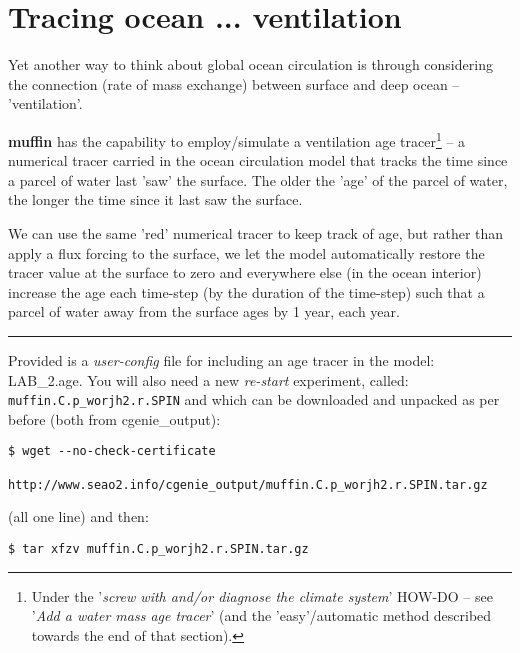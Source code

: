 \newpage

\section{Tracing ocean ... ventilation}

Yet another way to think about global ocean circulation is through considering the connection (rate of mass exchange) between surface and deep ocean -- 'ventilation'.

\textbf{muffin} has the capability to employ/simulate a ventilation age tracer\footnote{Under the '\textit{screw with and/or diagnose the climate system}' HOW-DO -- see '\textit{Add a water mass age tracer}' (and the 'easy'/automatic method described towards the end of that section).} -- a numerical tracer carried in the ocean circulation model that tracks the time since a parcel of water last 'saw' the surface. The older the 'age' of the parcel of water, the longer the time since it last saw the surface.

We can use the same 'red' numerical tracer to keep track of age, but rather than apply a flux forcing to the surface, we let the model automatically restore the tracer value at the surface to zero and everywhere else (in the ocean interior) increase the age each time-step (by the duration of the time-step) such that a parcel of water away from the surface ages by 1 year, each year.

\vspace{1mm}
\noindent\rule{4cm}{0.5pt}
\vspace{2mm}

\noindent Provided is a  \textit{user-config} file for including an age tracer in the model: \textsf{\footnotesize LAB\_2.age}. You will also need a new \textit{re-start} experiment, called: \texttt{muffin.C.p\_worjh2.r.SPIN} and which can be downloaded and unpacked as per before (both from \textsf{\footnotesize cgenie\_output)}:

\vspace{-1mm}\small
\begin{verbatim}
$ wget --no-check-certificate 
     http://www.seao2.info/cgenie_output/muffin.C.p_worjh2.r.SPIN.tar.gz
\end{verbatim}
\normalsize\vspace{-1mm}
(all one line) and then:
\vspace{-1mm}\small
\begin{verbatim}
$ tar xfzv muffin.C.p_worjh2.r.SPIN.tar.gz
\end{verbatim}
\normalsize\vspace{-1mm}

